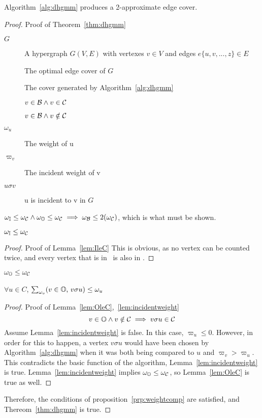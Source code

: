 

\begin{thm}
  Algorithm~\ref{alg:dhgmm} produces a 2-approximate edge cover.
  \label{thm:dhgmm}
\end{thm}
\begin{proof}{Proof of Theorem~\ref{thm:dhgmm}}
  \begin{dfn}
    \begin{description}
    \item[$G$] A hypergraph $G(V,E)$ with vertexes $v \in V$ and edges $e\{u,v,...,z\} \in E$
    \item[\cCd] The optimal edge cover of $G$
    \item[\cBd] The cover generated by Algorithm~\ref{alg:dhgmm}
    \item[\bId] $v \in {\mathcal B} \land v\in {\mathcal C}$
    \item[\bOd] $v \in {\mathcal B} \land v\notin {\mathcal C}$
    \item[$\omega_u$] The weight of u
    \item[$\varpi_v$] The incident weight of v
    \item[$ u \sigma v $] u is incident to v in $G$
    \end{description}
  \end{dfn}
  \begin{prop}
    $\omega_{{\mathbb I}} \le \omega_{{\mathcal C}} \land \omega_{{\mathbb O}} \le \omega_{{\mathcal C}} \implies \omega_{{\mathcal B}} \le 2(\omega_{{\mathcal C}})$, which is what must be shown.
    \label{prp:weightcomp}
  \end{prop}

  \begin{lem}
    $\omega_{{\mathbb I}} \le \omega_{{\mathcal C}}$
    \label{lem:IleC}
  \end{lem}
  \begin{proof}{Proof of Lemma~\ref{lem:IleC}}
    This is obvious, as no vertex can be counted twice, and every vertex that is in \bId\ is also in \cCd.
  \end{proof}
  \begin{lem}
    $\omega_{{\mathbb O}} \le \omega_{{\mathcal C}}$
    \label{lem:OleC}
  \end{lem}
  \begin{lem}
    $\forall u \in C$, $\sum_{\omega_v} (v \in {\mathbb O}\text{, }v \sigma u) \le \omega_u$
    \label{lem:incidentweight}
  \end{lem}
  \begin{proof}{Proof of Lemma~\ref{lem:OleC},~\ref{lem:incidentweight}}
    \begin{equation}
      v \in {\mathbb O} \land v \notin {\mathcal C} \implies v \sigma u \in {\mathcal C}
    \end{equation}
    Assume Lemma~\ref{lem:incidentweight} is false. In this case, $\varpi_u \le 0$. However, in order for this to happen, a vertex $v\sigma u$ would have been chosen by Algorithm~\ref{alg:dhgmm} when it was both being compared to $u$ and $\varpi_v > \varpi_u$. This contradicts the basic function of the algorithm, Lemma~\ref{lem:incidentweight} is true.
    Lemma~\ref{lem:incidentweight} implies $\omega_{{\mathbb O}} \le \omega_{{\mathcal C}}$, so Lemma~\ref{lem:OleC} is true as well.
  \end{proof}
        
  Therefore, the conditions of proposition~\ref{prp:weightcomp} are satisfied, and Thereom~\ref{thm:dhgmm} is true.
\end{proof}
